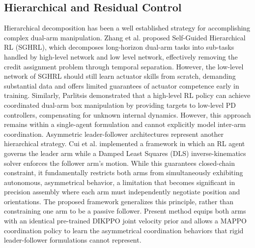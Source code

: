 \documentclass[lettersize,journal]{IEEEtran}
\begin{document}
\subsection{Hierarchical and Residual Control}
Hierarchical decomposition has been a well established strategy for accomplishing complex dual-arm manipulation. Zhang et al. \cite{related-37} proposed Self-Guided Hierarchical RL (SGHRL), which decomposes long-horizon dual-arm tasks into sub-tasks handled by high-level network and low level network, effectively removing the credit assignment problem through temporal separation. However, the low-level network of SGHRL should still learn actuator skills from scratch, demanding substantial data and offers limited guarantees of actuator competence early in training. Similarly, Parlitsis \cite{related-38} demonstrated that a high-level RL policy can achieve coordinated dual-arm box manipulation by providing targets to low-level PD controllers, compensating for unknown internal dynamics. However, this approach remains within a single-agent formulation and cannot explicitly model inter-arm coordination. Asymmetric leader-follower architectures represent another hierarchical strategy. Cui et al. \cite{related-39} implemented a framework in which an RL agent governs the leader arm while a Damped Least Squares (DLS) inverse-kinematics solver enforces the follower arm's motion. While this guarantees closed-chain constraint, it fundamentally restricts both arms from simultaneously exhibiting autonomous, asymmetrical behavior, a limitation that becomes significant in precision assembly where each arm must independently negotiate position and orientations. The proposed framework generalizes this principle, rather than constraining one arm to be a passive follower. Present method equips both arms with an identical pre-trained DIKPPO joint velocity prior and allows a MAPPO coordination policy to learn the asymmetrical coordination behaviors that rigid leader-follower formulations cannot represent.
\end{document}

